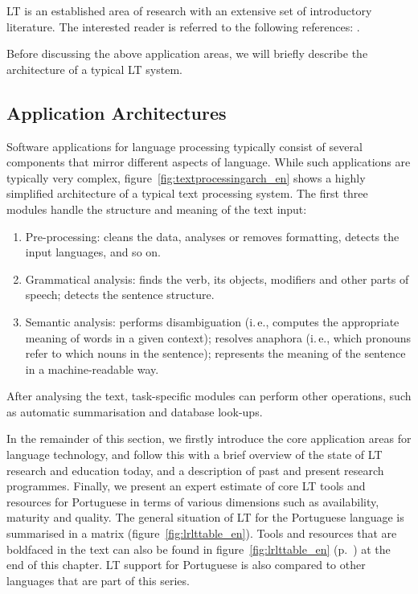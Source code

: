\begin{multicols}{2}
LT is an established area of research with an extensive set of introductory literature. The interested reader is referred to the following references:  \cite{carstensen-etal1, jurafsky-martin01, manning-schuetze1, lt-world1, lt-survey1}.

Before discussing the above application areas, we will briefly describe the architecture of a typical LT system.

\subsection{Application Architectures}

Software applications for language processing typically consist of several components that mirror different aspects of language. While such applications are typically very complex, figure~\ref{fig:textprocessingarch_en} shows a highly simplified architecture of a typical text processing system. The first three modules handle the structure and meaning of the text input:

\begin{enumerate}
\item Pre-processing: cleans the data, analyses or removes formatting, detects the input languages, and so on.
\item Grammatical analysis: finds the verb, its objects, modifiers and other parts of speech; detects the sentence structure.
\item Semantic analysis: performs disambiguation (i.\,e., computes the appropriate meaning of words in a given context); resolves anaphora (i.\,e., which pronouns refer to which nouns in the sentence); represents the meaning of the sentence in a machine-readable way.
\end{enumerate}

After analysing the text, task-specific modules can perform other operations, such as automatic summarisation and database look-ups.

In the remainder of this section, we firstly introduce the core application areas for language technology, and follow this with a brief overview of the state of LT research and education today, and a description of past and present research programmes. Finally, we present an expert estimate of core LT tools and resources for Portuguese in terms of various dimensions such as availability, maturity and quality. The general situation of LT for the Portuguese language is summarised in a matrix (figure~\ref{fig:lrlttable_en}). Tools and resources that are boldfaced in the text can also be found in figure~\ref{fig:lrlttable_en} (p.~\pageref{fig:lrlttable_en}) at the end of this chapter. LT support for Portuguese is also compared to other languages that are part of this series.


\end{multicols}
